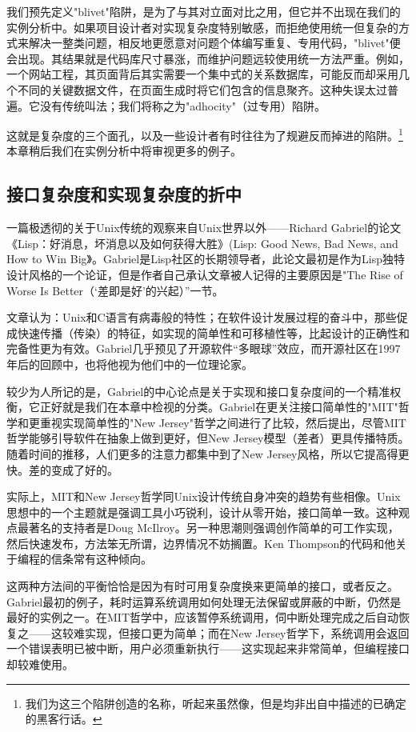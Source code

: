 \documentclass[12pt,oneside]{book}
\begin{document}
\begin{common-format}
我们预先定义"blivet"陷阱，是为了与其对立面对比之用，但它并不出现在我们的实例分析中。如果项目设计者对实现复杂度特别敏感，而拒绝使用统一但复杂的方式来解决一整类问题，相反地更愿意对问题个体编写重复、专用代码，"blivet"便会出现。其结果就是代码库尺寸暴涨，而维护问题远较使用统一方法严重。例如，一个网站工程，其页面背后其实需要一个集中式的关系数据库，可能反而却采用几个不同的关键数据文件，在页面生成时将它们包含的信息聚齐。这种失误太过普遍。它没有传统叫法；我们将称之为"adhocity"（过专用）陷阱。

这就是复杂度的三个面孔，以及一些设计者有时往往为了规避反而掉进的陷阱。\footnote{我们为这三个陷阱创造的名称，听起来虽然像，但是均非出自\cite{Raymond96}中描述的已确定的黑客行话。}本章稍后我们在实例分析中将审视更多的例子。

\subsection{接口复杂度和实现复杂度的折中}
一篇极透彻的关于Unix传统的观察来自Unix世界以外——Richard Gabriel的论文《Lisp：好消息，坏消息以及如何获得大胜》(Lisp: Good News, Bad News, and How to Win Big》\cite{Gabriel}。Gabriel是Lisp社区的长期领导者，此论文最初是作为Lisp独特设计风格的一个论证，但是作者自己承认文章被人记得的主要原因是"The Rise of Worse Is Better（‘差即是好’的兴起）”一节。

文章认为：Unix和C语言有病毒般的特性；在软件设计发展过程的奋斗中，那些促成快速传播（传染）的特征，如实现的简单性和可移植性等，比起设计的正确性和完备性更为有效。Gabriel几乎预见了开源软件“多眼球”效应，而开源社区在1997年后的回顾中，也将他视为他们中的一位理论家。

较少为人所记的是，Gabriel的中心论点是关于实现和接口复杂度间的一个精准权衡，它正好就是我们在本章中检视的分类。Gabriel在更关注接口简单性的"MIT"哲学和更重视实现简单性的"New Jersey"哲学之间进行了比较，然后提出，尽管MIT哲学能够引导软件在抽象上做到更好，但New Jersey模型（差者）更具传播特质。随着时间的推移，人们更多的注意力都集中到了New Jersey风格，所以它提高得更快。差的变成了好的。

实际上，MIT和New Jersey哲学同Unix设计传统自身冲突的趋势有些相像。Unix思想中的一个主题就是强调工具小巧锐利，设计从零开始，接口简单一致。这种观点最著名的支持者是Doug McIlroy。另一种思潮则强调创作简单的可工作实现，然后快速发布，方法笨无所谓，边界情况不妨搁置。Ken Thompson的代码和他关于编程的信条常有这种倾向。

这两种方法间的平衡恰恰是因为有时可用复杂度换来更简单的接口，或者反之。Gabriel最初的例子，耗时运算系统调用如何处理无法保留或屏蔽的中断，仍然是最好的实例之一。在MIT哲学中，应该暂停系统调用，伺中断处理完成之后自动恢复之——这较难实现，但接口更为简单；而在New Jersey哲学下，系统调用会返回一个错误表明已被中断，用户必须重新执行——这实现起来非常简单，但编程接口却较难使用。


\end{common-format}
\end{document}
